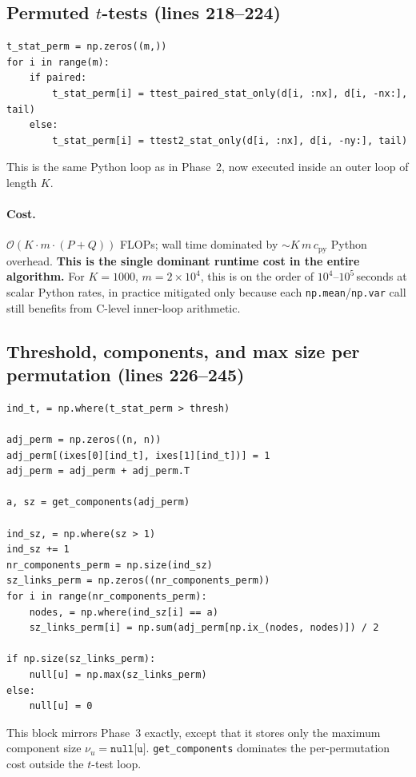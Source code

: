 \documentclass[11pt]{article}
\begin{document}
\subsection{Permuted $t$-tests (lines 218--224)}

\begin{lstlisting}[firstnumber=218]
t_stat_perm = np.zeros((m,))
for i in range(m):
    if paired:
        t_stat_perm[i] = ttest_paired_stat_only(d[i, :nx], d[i, -nx:], tail)
    else:
        t_stat_perm[i] = ttest2_stat_only(d[i, :nx], d[i, -ny:], tail)
\end{lstlisting}

This is the same Python loop as in Phase~2, now executed inside an outer loop of length $K$.

\paragraph{Cost.} $\mathcal{O}(K \cdot m \cdot (P+Q))$ FLOPs; wall time dominated by $\sim K\,m\,c_{\textrm{py}}$ Python overhead. \textbf{This is the single dominant runtime cost in the entire algorithm.} For $K=1000$, $m=2\times 10^4$, this is on the order of $10^4$--$10^5$\,seconds at scalar Python rates, in practice mitigated only because each \texttt{np.mean}/\texttt{np.var} call still benefits from C-level inner-loop arithmetic.

\subsection{Threshold, components, and max size per permutation (lines 226--245)}

\begin{lstlisting}[firstnumber=226]
ind_t, = np.where(t_stat_perm > thresh)

adj_perm = np.zeros((n, n))
adj_perm[(ixes[0][ind_t], ixes[1][ind_t])] = 1
adj_perm = adj_perm + adj_perm.T

a, sz = get_components(adj_perm)

ind_sz, = np.where(sz > 1)
ind_sz += 1
nr_components_perm = np.size(ind_sz)
sz_links_perm = np.zeros((nr_components_perm))
for i in range(nr_components_perm):
    nodes, = np.where(ind_sz[i] == a)
    sz_links_perm[i] = np.sum(adj_perm[np.ix_(nodes, nodes)]) / 2

if np.size(sz_links_perm):
    null[u] = np.max(sz_links_perm)
else:
    null[u] = 0
\end{lstlisting}

This block mirrors Phase~3 exactly, except that it stores only the maximum component size $\nu_u = \texttt{null[u]}$. \texttt{get\_components} dominates the per-permutation cost outside the $t$-test loop.
\end{document}
